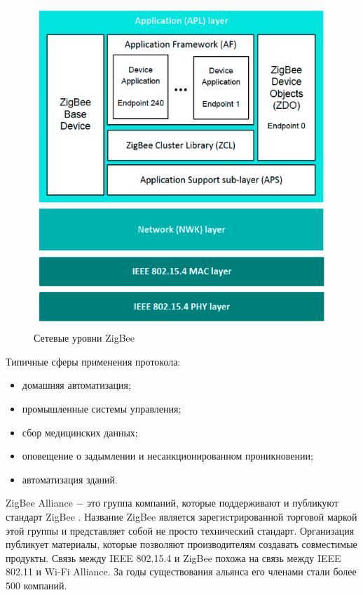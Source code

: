 	\begin{figure}[H]
		\centering
		\includegraphics[scale=0.6]{resources/ZigBee-network-layers}
		\caption{Сетевые уровни ZigBee}
		\label{fig1.2}
	\end{figure}
	
   Типичные сферы применения протокола:
	\begin{itemize}
		\item домашняя автоматизация;
		\item промышленные системы управления;
		\item сбор медицинских данных;
		\item оповещение о задымлении и несанкционированном проникновении;
		\item автоматизация зданий.
	\end{itemize}

	ZigBee Alliance $-$ это группа компаний, которые поддерживают и публикуют стандарт ZigBee
	 \cite{zigbee-alliance}. Название 
	ZigBee является зарегистрированной торговой маркой этой группы и представляет собой не просто 
	технический стандарт. Организация публикует материалы, которые позволяют производителям 
	создавать совместимые продукты. Связь между IEEE 802.15.4 и ZigBee похожа на связь между 
	IEEE 802.11 и Wi-Fi Alliance. За годы существования альянса его членами стали более 500 компаний.
	
